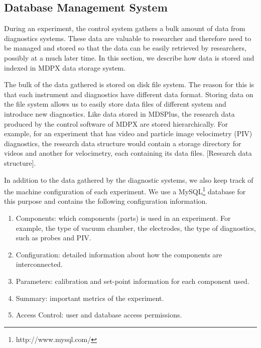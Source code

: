 \subsection{Database Management System}

During an experiment, the control system gathers a bulk amount of data from diagnostics systems. These data are valuable to researcher and therefore need to be managed and stored so that the data can be easily retrieved by researchers, possibly at a much later time. In this section, we describe how data is stored and indexed in MDPX data storage system.

The bulk of the data gathered is stored on disk file system. The reason for this is that each instrument and diagnostics have different data format. Storing data on the file system allows us to easily store data files of different system and introduce new diagnostics. Like data stored in MDSPlus, the research data produced by the control software of MDPX are stored hierarchically. For example, for an experiment that has video and particle image velocimetry (PIV) diagnostics, the research data structure would contain a storage directory for videos and another for velocimetry, each containing its data files. [Research data structure].

In addition to the data gathered by the diagnostic systems, we also keep track of the machine configuration of each experiment. We use a MySQL\footnote{http://www.mysql.com/} database for this purpose and contains the following configuration information.

\begin{enumerate}
\item Components: which components (parts) is used in an experiment. For example, the type of vacuum chamber, the electrodes, the type of diagnostics, such as probes and PIV.
\item Configuration: detailed information about how the components are interconnected.
\item Parameters: calibration and set-point information for each component used. %
\item Summary: important metrics of the experiment.
\item Access Control: user and database access permissions.
\end{enumerate}

